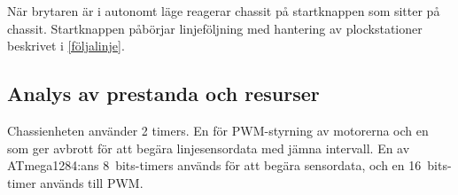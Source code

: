 När brytaren är i autonomt läge reagerar chassit på startknappen som sitter på chassit. Startknappen påbörjar linjeföljning med hantering av plockstationer beskrivet i \ref{följalinje}.

\subsection{Analys av prestanda och resurser}

Chassienheten använder 2 timers. En för PWM-styrning av motorerna och en som ger avbrott för att begära linjesensordata med jämna intervall. En av ATmega1284:ans 8~bits-timers används för att begära sensordata, och en 16~bits-timer används till PWM.



